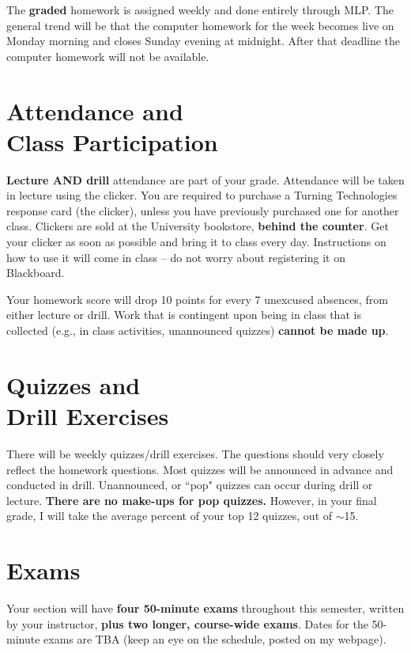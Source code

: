 \documentclass[margin,line,pifont,palatino,courier]{res}
\begin{document}
\begin{resume}
The {\bf graded} homework is assigned weekly and done entirely through MLP.  The general trend will be that the computer homework for the week becomes live on Monday morning and closes Sunday evening at midnight. After that deadline the computer homework will not be available.  

\section{\sc Attendance and \\ Class Participation} {\bf Lecture AND drill} attendance are part of your grade.  Attendance will be taken in lecture using the clicker.  You are required to purchase a Turning Technologies response card (the clicker), unless you have previously purchased one for another class.  Clickers are sold at the University bookstore, {\bf behind the counter}.  Get your clicker as soon as possible and bring it to class every day.  Instructions on how to use it will come in class -- do not worry about registering it on Blackboard.

Your homework score will drop 10 points for every 7 unexcused absences, from either lecture or drill.  Work that is contingent upon being in class that is collected (e.g., in class activities, unannounced quizzes) {\bf cannot be made up}.  

\section{\sc Quizzes and \\ Drill Exercises} There will be weekly quizzes/drill exercises.  The questions should very closely reflect the homework questions.  Most quizzes will be announced in advance and conducted in drill.  Unannounced, or ``pop" quizzes can occur during drill or lecture.  {\bf There are no make-ups for pop quizzes.} However, in your final grade, I will take the average percent of your top 12 quizzes, out of $\sim$15.   

\section{\sc Exams} Your section will have {\bf four 50-minute exams} throughout this semester, written by your instructor, {\bf plus two longer, course-wide exams}.  Dates for the 50-minute exams are TBA (keep an eye on the schedule, posted on my webpage).  


\end{resume}
\end{document}
